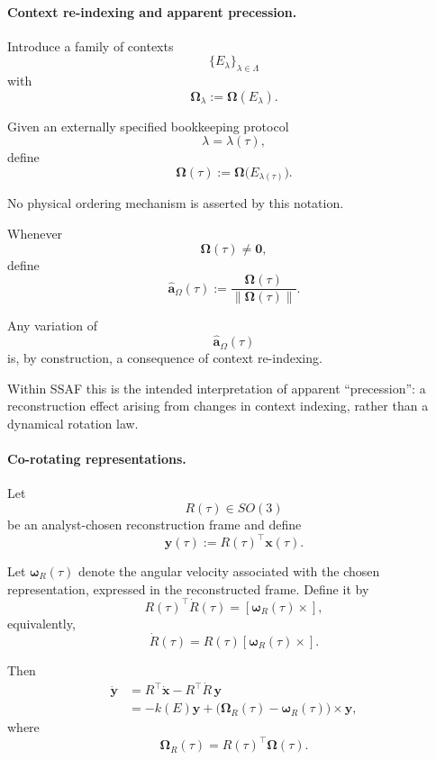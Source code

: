 \documentclass[aps,prx,onecolumn,11pt]{revtex4-2}
\theoremstyle{plain}
\theoremstyle{definition}
\theoremstyle{remark}
\begin{document}
\paragraph{Context re-indexing and apparent precession.}

Introduce a family of contexts
\[
\{E_\lambda\}_{\lambda\in\Lambda}
\]
with
\[
\boldsymbol{\Omega}_\lambda
:=
\boldsymbol{\Omega}(E_\lambda).
\]

Given an externally specified bookkeeping protocol
\[
\lambda=\lambda(\tau),
\]
define
\[
\boldsymbol{\Omega}(\tau)
:=
\boldsymbol{\Omega}
\bigl(
E_{\lambda(\tau)}
\bigr).
\]

No physical ordering mechanism is asserted by this notation.

Whenever
\[
\boldsymbol{\Omega}(\tau)\neq\mathbf 0,
\]
define
\begin{equation}
\widehat{\mathbf a}_{\Omega}(\tau)
:=
\frac{
\boldsymbol{\Omega}(\tau)
}{
\|\boldsymbol{\Omega}(\tau)\|
}.
\label{eq:toy_axis_proxy_drift}
\end{equation}

Any variation of
\[
\widehat{\mathbf a}_{\Omega}(\tau)
\]
is, by construction, a consequence of context re-indexing.

Within SSAF this is the intended interpretation of apparent
``precession'': a reconstruction effect arising from changes in context
indexing, rather than a dynamical rotation law.

\paragraph{Co-rotating representations.}

Let
\[
R(\tau)\in SO(3)
\]
be an analyst-chosen reconstruction frame and define
\[
\mathbf y(\tau)
:=
R(\tau)^\top
\mathbf x(\tau).
\]

Let
\(\boldsymbol{\omega}_R(\tau)\) denote the angular velocity associated
with the chosen representation, expressed in the reconstructed frame.
Define it by
\[
R(\tau)^\top\dot R(\tau)
=
[\boldsymbol{\omega}_R(\tau)\times],
\]
equivalently,
\[
\dot R(\tau)
=
R(\tau)[\boldsymbol{\omega}_R(\tau)\times].
\]

Then
\begin{align}
\dot{\mathbf y}
&=
R^\top\dot{\mathbf x}
-
R^\top\dot R\,\mathbf y
\nonumber\\
&=
-k(E)\mathbf y
+
\bigl(
\boldsymbol{\Omega}_R(\tau)
-
\boldsymbol{\omega}_R(\tau)
\bigr)
\times
\mathbf y,
\label{eq:toy_compensated_frame}
\end{align}
where
\[
\boldsymbol{\Omega}_R(\tau)
=
R(\tau)^\top
\boldsymbol{\Omega}(\tau).
\]
\end{document}
